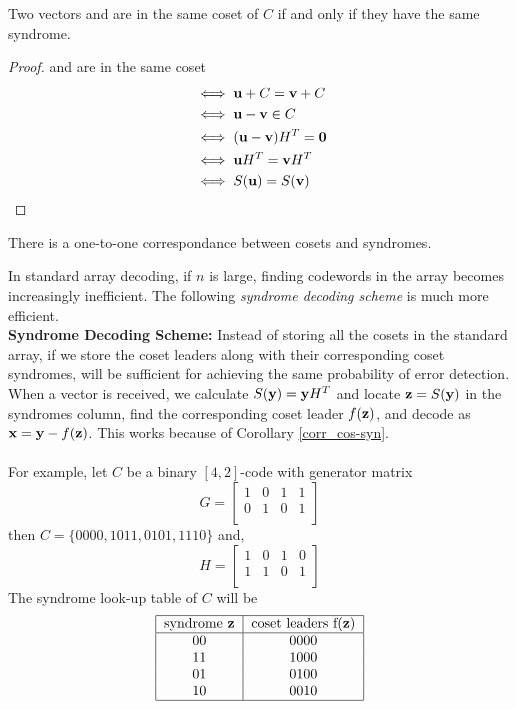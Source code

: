 \documentclass[../main.tex]{subfiles}
\begin{document}
\begin{lem}
	Two vectors  and  are in the same coset of $C$ if and only if they have the same syndrome.
\end{lem}
\begin{proof}
	 and  are in the same coset
	\begin{align*}
		&\iff \textbf{u}+C=\textbf{v}+C\\
		&\iff \textbf{u}-\textbf{v}\in C\\
		&\iff (\textbf{u}-\textbf{v})H^T=\textbf{0}\\
		&\iff \textbf{u}H^T = \textbf{v}H^T\\
		&\iff S(\textbf{u}) = S(\textbf{v})\\
	\end{align*}
\end{proof}

\begin{cor}\label{corr_cos-syn}
	There is a one-to-one correspondance between cosets and syndromes.
\end{cor}

In standard array decoding, if $n$ is large, finding codewords in the array becomes increasingly inefficient. The following \emph{syndrome decoding scheme} is much more efficient.\\

\textbf{Syndrome Decoding Scheme:} Instead of storing all the cosets in the standard array, if we store the coset leaders along with their corresponding coset syndromes, will be sufficient for achieving the same probability of error detection. When a vector  is received, we calculate $S(\textbf{y}) = \textbf{y}H^T$ and locate $\textbf{z}=S(\textbf{y})$ in the syndromes column, find the corresponding coset leader $f(\textbf{z})$, and decode  as $\textbf{x}=\textbf{y}-f(\textbf{z})$. This works because of Corollary \ref{corr_cos-syn}.\\\\
For example, let $C$ be a binary $[4,2]$-code with generator matrix
\[
	G = \begin{bmatrix}
		1 & 0 & 1 & 1\\
		0 & 1 & 0 & 1\\
	\end{bmatrix}
\]
then $C=\{0000,1011,0101,1110\}$ and,
\[
	H = \begin{bmatrix}
		1 & 0 & 1 & 0\\
		1 & 1 & 0 & 1\\
	\end{bmatrix}
\]
The syndrome look-up table of $C$ will be
\[
	\begin{tabular}{|c|c|}
		\hline
		\text{syndrome \code{z}} & \text{coset leaders} f(\code{z})\\
		\hline
		00 & 0000 \\
		11 & 1000\\
		01 & 0100\\
		10 & 0010\\
		\hline 					
 	\end{tabular}
\]
 
\end{document}

